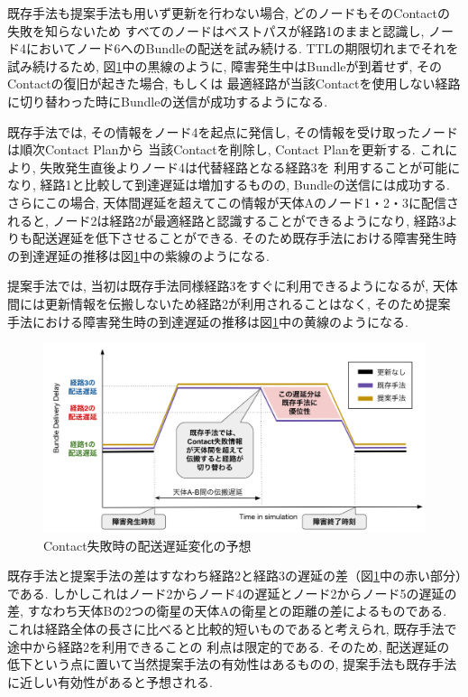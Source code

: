 既存手法も提案手法も用いず更新を行わない場合, どのノードもそのContactの失敗を知らないため
すべてのノードはベストパスが経路1のままと認識し, ノード4においてノード6へのBundleの配送を試み続ける.
TTLの期限切れまでそれを試み続けるため, 図\ref{fig:example_of_delaychange}中の黒線のように, 
障害発生中はBundleが到着せず, そのContactの復旧が起きた場合, もしくは
最適経路が当該Contactを使用しない経路に切り替わった時にBundleの送信が成功するようになる. 

既存手法では, その情報をノード4を起点に発信し, その情報を受け取ったノードは順次Contact Planから
当該Contactを削除し, Contact Planを更新する. これにより, 失敗発生直後よりノード4は代替経路となる経路3を
利用することが可能になり, 経路1と比較して到達遅延は増加するものの, Bundleの送信には成功する. さらにこの場合, 
天体間遅延を超えてこの情報が天体Aのノード1・2・3に配信されると, 
ノード2は経路2が最適経路と認識することができるようになり, 経路3よりも配送遅延を低下させることができる. 
そのため既存手法における障害発生時の到達遅延の推移は図\ref{fig:example_of_delaychange}中の紫線のようになる. 

提案手法では, 当初は既存手法同様経路3をすぐに利用できるようになるが, 
天体間には更新情報を伝搬しないため経路2が利用されることはなく, 
そのため提案手法における障害発生時の到達遅延の推移は図\ref{fig:example_of_delaychange}中の黄線のようになる. 

\begin{figure}[tbh]
    \centering
    \includegraphics[width=0.7\textheight]{img/example_of_delaychange.pdf}
    \caption{Contact失敗時の配送遅延変化の予想}
    \label{fig:example_of_delaychange}
\end{figure}

既存手法と提案手法の差はすなわち経路2と経路3の遅延の差（図\ref{fig:example_of_delaychange}中の赤い部分）である.
しかしこれはノード2からノード4の遅延とノード2からノード5の遅延の差, 
すなわち天体Bの2つの衛星の天体Aの衛星との距離の差によるものである. 
これは経路全体の長さに比べると比較的短いものであると考えられ, 既存手法で途中から経路2を利用できることの
利点は限定的である. そのため, 配送遅延の低下という点に置いて当然提案手法の有効性はあるものの, 
提案手法も既存手法に近しい有効性があると予想される.  

